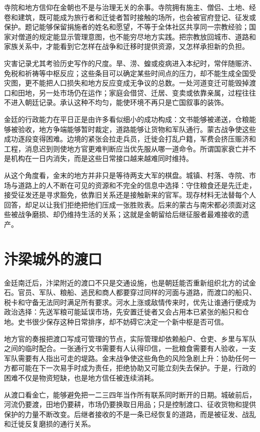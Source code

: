 寺院和地方信仰在金朝也不是与治理无关的余事。寺院拥有施主、僧侣、土地、经卷和建筑，既可能成为旅行者和迁徙者暂时接触的场所，也会被官府登记、征发或保护。题记能够保留捐施者的姓名和愿望，不等于全体社区共享同一宗教经验；国家对僧道的规定能显示管理意图，也不能穷尽地方实践。把宗教放回城市、道路和家族关系中，才能看到它怎样在战争和迁移时提供资源，又怎样承担新的负担。

灾害记录尤其考验历史写作的尺度。旱、涝、蝗或疫病进入本纪时，常伴随赈济、免税和祈祷等中枢反应；这些条目可以确定某些时间点的压力，却不能生成全国受灾图，更不能把人口损失和地方反应变成无争议的总数。一处河道变迁可能毁掉渡口和田地，另一处市场仍在运作；家庭会借贷、迁居、变卖或依靠亲属，过程往往不进入朝廷记录。承认这种不均匀，能使环境不再只是亡国叙事的装饰。

金廷的行政能力在平日正是由许多看似细小的成功构成：文书能够被递送，仓粮能够被验收，地方争端能够暂时裁定，道路能够让货物和军队通行。蒙古战争使这些成功逐段变得困难。边境的紧张会拉走兵员，迁徙会打乱户籍，军费会挤压赈济和工程，消息迟到则使地方官更难判断应当优先服从哪一道命令。所谓国家衰亡并不是机构在一日内消失，而是这些日常接口越来越难同时维持。

从这个角度看，金末的地方并非只是等待两支大军的棋盘。城镇、村落、寺院、市场与道路上的人不断在可见的资源和不完全的信息中选择：守住粮食还是先迁走，接受征发还是寻求豁免，依靠旧关系还是接触新来的官军。现存材料无法替每个人回答，却足以让我们拒绝把他们压成一张胜败表。后来的蒙古与南宋都必须面对这些被战争磨损、却仍维持生活的关系；这就是金朝留给后继征服者最难接收的遗产。

\section{汴梁城外的渡口}

金廷南迁后，汴梁附近的渡口不只是交通设施，也是朝廷能否重新组织北方的试金石。官员、军队、粮船、逃民和商人都要穿过同样的河面与道路，而渡口的船只、税卡和守备无法同时满足所有要求。河水上涨或敌情传来时，优先让谁通行便成为政治选择：先送军粮可能延误市场，先安置迁徙者又会占用本已紧张的船只和仓地。史书很少保存这种日常排序，却不妨碍它决定一个新中枢是否可信。

地方官的奏报把渡口写成可管理的节点，实际管理却依赖船户、仓吏、乡里与军队之间的临时配合。一张通行文书需要有人认得印信，一批粮食需要有人验收，一支军队需要有人指出可走的堤路。金末战争使这些角色的风险急剧上升：协助任何一方都可能在下一次易手时成为责任，拒绝协助又可能立刻失去保护。于是，行政的困难不仅是物资短缺，也是地方信任被连续消耗。

从渡口看金亡，能够避免把一二三四年当作所有联系同时断开的日期。城破前后，河流仍要渡，田地仍要耕，市场仍要换取日用品；只是控制渡口、征收货物和提供保护的力量不断改变。后继者接收的不是一条已经恢复的道路，而是被征发、战乱和迁徙反复磨损的通行关系。


